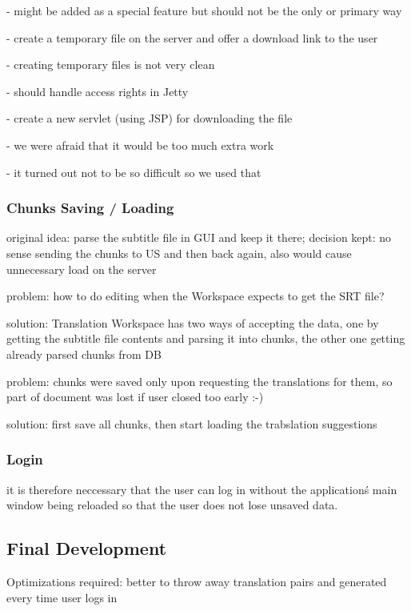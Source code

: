   - might be added as a special feature but should not be the only or primary way

- create a temporary file on the server and offer a download link to the user

  - creating temporary files is not very clean
  
  - should handle access rights in Jetty

- create a new servlet (using JSP) for downloading the file

  - we were afraid that it would be too much extra work
  
  - it turned out not to be so difficult so we used that

\subsubsection{Chunks Saving / Loading}

original idea: parse the subtitle file in GUI and keep it there; decision kept: no sense sending the chunks to US and then back again, also would cause unnecessary load on the server

problem: how to do editing when the Workspace expects to get the SRT file?

solution: Translation Workspace has two ways of accepting the data, one by getting the subtitle file contents and parsing it into chunks, the other one getting already parsed chunks from DB


problem: chunks were saved only upon requesting the translations for them, so part of document was lost if user closed too early :-)

solution: first save all chunks, then start loading the trabslation suggestions


\subsubsection{Login}
it is therefore neccessary that the user can log in without the application\'s main window being reloaded so that the user does not lose unsaved data.

\subsection{Final Development}
\label{subsec:final_development}

Optimizations required: better to throw away translation pairs and generated every time user logs in

